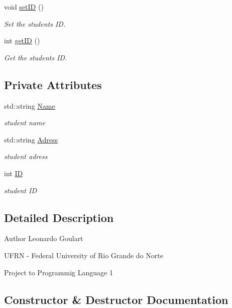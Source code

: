 \begin{DoxyCompactItemize}
void \hyperlink{classStudent_ae4d074aadddc5f9715822bb8ed88f4b3}{set\+ID} ()
\begin{DoxyCompactList}\small\item\em Set the student\textquotesingle{}s ID. \end{DoxyCompactList}\item 
int \hyperlink{classStudent_ad9ecfdedf31773046febf2ff3edf798e}{get\+ID} ()
\begin{DoxyCompactList}\small\item\em Get the student\textquotesingle{}s ID. \end{DoxyCompactList}\end{DoxyCompactItemize}
\subsection*{Private Attributes}
\begin{DoxyCompactItemize}
\item 
std\+::string \hyperlink{classStudent_a914e02c29156e1a3b1b51cad6bbc9083}{Name}
\begin{DoxyCompactList}\small\item\em student name \end{DoxyCompactList}\item 
std\+::string \hyperlink{classStudent_a2ce7f219072c295b7f3bc95db09625f3}{Adress}
\begin{DoxyCompactList}\small\item\em student adress \end{DoxyCompactList}\item 
int \hyperlink{classStudent_abb8d0bd3565b4c8ce2b37247542283b5}{ID}
\begin{DoxyCompactList}\small\item\em student ID \end{DoxyCompactList}\end{DoxyCompactItemize}


\subsection{Detailed Description}
\begin{DoxyAuthor}{Author}
Leonardo Goulart 

U\+F\+RN -\/ Federal University of Rio Grande do Norte 

Project to Programmig Language 1 
\end{DoxyAuthor}


\subsection{Constructor \& Destructor Documentation}
